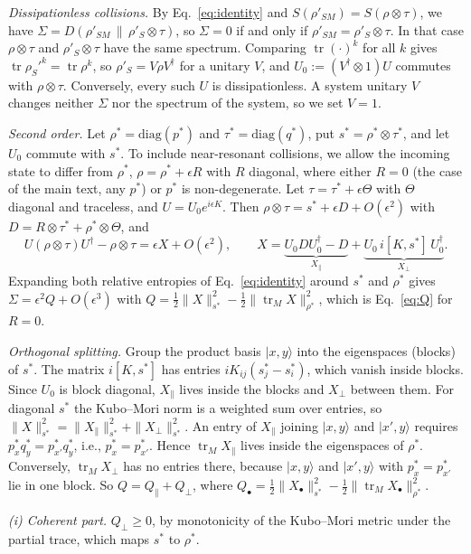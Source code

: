 \documentclass[aps,prl,reprint,superscriptaddress,amsmath,amssymb]{revtex4-2}
\newcommand{\Tr}{\operatorname{tr}}
\newcommand{\Dr}[2]{D(#1\,\|\,#2)}
\begin{document}
\emph{Dissipationless collisions.} By Eq.~\eqref{eq:identity} and $S(\rho'_{SM})=S(\rho\otimes\tau)$, we have
$\Sigma=\Dr{\rho'_{SM}}{\rho'_S\otimes\tau}$, so $\Sigma=0$ if and only if $\rho'_{SM}=\rho'_S\otimes\tau$. In that case
$\rho\otimes\tau$ and $\rho'_S\otimes\tau$ have the same spectrum. Comparing $\Tr(\cdot)^k$ for all $k$ gives
$\Tr\rho_S'^k=\Tr\rho^k$, so $\rho'_S=V\rho V^\dagger$ for a unitary $V$, and $U_0:=(V^\dagger\otimes1)U$ commutes
with $\rho\otimes\tau$. Conversely, every such $U$ is dissipationless. A system unitary $V$ changes neither $\Sigma$
nor the spectrum of the system, so we set $V=1$.

\emph{Second order.} Let $\rho^*=\mathrm{diag}(p^*)$ and $\tau^*=\mathrm{diag}(q^*)$, put $s^*=\rho^*\otimes\tau^*$,
and let $U_0$ commute with $s^*$. To include near-resonant collisions, we allow the incoming state to differ from
$\rho^*$, $\rho=\rho^*+\epsilon R$ with $R$ diagonal, where either $R=0$ (the case of the main text, any $p^*$) or $p^*$
is non-degenerate. Let $\tau=\tau^*+\epsilon\Theta$ with $\Theta$ diagonal and traceless, and $U=U_0e^{i\epsilon K}$.
Then $\rho\otimes\tau=s^*+\epsilon D+O(\epsilon^2)$ with $D=R\otimes\tau^*+\rho^*\otimes\Theta$, and
\[
U(\rho\otimes\tau)U^\dagger-\rho\otimes\tau=\epsilon X+O(\epsilon^2),\qquad
X=\underbrace{U_0DU_0^\dagger-D}_{X_\parallel}+\underbrace{U_0\,i[K,s^*]\,U_0^\dagger}_{X_\perp}.
\]
Expanding both relative entropies of Eq.~\eqref{eq:identity} around $s^*$ and $\rho^*$ gives
$\Sigma=\epsilon^2Q+O(\epsilon^3)$ with $Q=\tfrac12\|X\|^2_{s^*}-\tfrac12\|\Tr_MX\|^2_{\rho^*}$, which is
Eq.~\eqref{eq:Q} for $R=0$.

\emph{Orthogonal splitting.} Group the product basis $|x,y\rangle$ into the eigenspaces (blocks) of $s^*$. The matrix
$i[K,s^*]$ has entries $iK_{ij}(s^*_j-s^*_i)$, which vanish inside blocks. Since $U_0$ is block diagonal, $X_\parallel$
lives inside the blocks and $X_\perp$ between them. For diagonal $s^*$ the Kubo--Mori norm is a weighted sum over
entries, so $\|X\|^2_{s^*}=\|X_\parallel\|^2_{s^*}+\|X_\perp\|^2_{s^*}$. An entry of $X_\parallel$ joining $|x,y\rangle$
and $|x',y\rangle$ requires $p^*_xq^*_y=p^*_{x'}q^*_y$, i.e., $p^*_x=p^*_{x'}$. Hence $\Tr_MX_\parallel$ lives inside
the eigenspaces of $\rho^*$. Conversely, $\Tr_MX_\perp$ has no entries there, because $|x,y\rangle$ and $|x',y\rangle$
with $p^*_x=p^*_{x'}$ lie in one block. So $Q=Q_\parallel+Q_\perp$, where
$Q_\bullet=\tfrac12\|X_\bullet\|^2_{s^*}-\tfrac12\|\Tr_MX_\bullet\|^2_{\rho^*}$.

\emph{(i) Coherent part.} $Q_\perp\geq0$, by monotonicity of the Kubo--Mori metric under the partial trace, which maps
$s^*$ to $\rho^*$.
\end{document}
